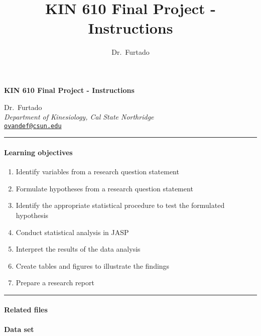 \documentclass[11pt,]{article}
\title{KIN 610 \textbar{} Final Project - Instructions}
\author{Dr.~Furtado}
\date{}
\newcommand{\blankline}{\quad\pagebreak[2]}
\providecommand{\tightlist}{%
  \setlength{\itemsep}{0pt}\setlength{\parskip}{0pt}}
\begin{document}
  



\thispagestyle{plain} 

\begin{flushleft}\Large \bf KIN 610 \textbar{} Final Project -
Instructions  \end{flushleft}
	\vspace{1 mm}   
Dr.~Furtado \\
\emph{Department of Kinesiology, Cal State Northridge} \\
\texttt{\href{mailto:ovandef@csun.edu}{\nolinkurl{ovandef@csun.edu}}}   \\

  

\hrule

\vspace{6 mm}
	


\hypertarget{learning-objectives}{%
\paragraph{Learning objectives}\label{learning-objectives}}

\begin{enumerate}
\def\labelenumi{\arabic{enumi}.}
\tightlist
\item
  Identify variables from a research question statement
\item
  Formulate hypotheses from a research question statement
\item
  Identify the appropriate statistical procedure to test the formulated
  hypothesis
\item
  Conduct statistical analysis in JASP
\item
  Interpret the results of the data analysis
\item
  Create tables and figures to illustrate the findings
\item
  Prepare a research report
\end{enumerate}

\begin{center}\rule{0.5\linewidth}{0.5pt}\end{center}

\hypertarget{related-files}{%
\paragraph{Related files}\label{related-files}}

\textbf{Data set}
\end{document}

